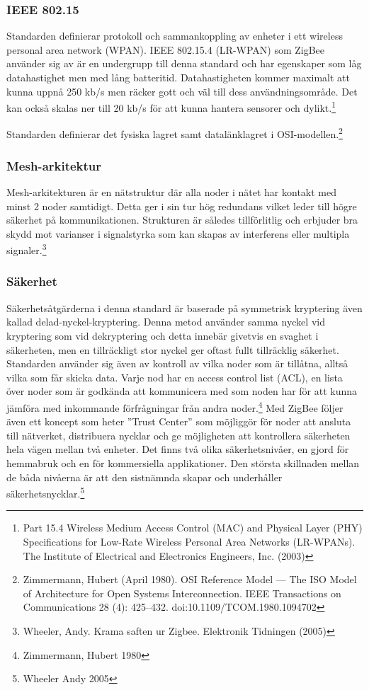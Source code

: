 \documentclass[a4paper,12pt,fleqn]{article}
\begin{document}
\subsubsection{IEEE 802.15}
Standarden definierar protokoll och sammankoppling av enheter i ett wireless personal area network (WPAN). IEEE 802.15.4 (LR-WPAN) som ZigBee använder sig av är en undergrupp till denna standard och har egenskaper som låg datahastighet men med lång batteritid. Datahastigheten kommer maximalt att kunna uppnå 250 kb/s men räcker gott och väl till dess användningsområde. Det kan också skalas ner till 20 kb/s för att kunna hantera sensorer och dylikt.\footnote{\label{IEEE} Part 15.4 Wireless Medium Access Control (MAC) and Physical Layer (PHY) Specifications for Low-Rate Wireless Personal Area Networks (LR-WPANs). The Institute of Electrical and Electronics Engineers, Inc. (2003)}


Standarden definierar det fysiska lagret samt datalänklagret i OSI-modellen.\footnote{Zimmermann, Hubert (April 1980). OSI Reference Model — The ISO Model of Architecture for Open Systems Interconnection. IEEE Transactions on Communications 28 (4): 425–432. doi:10.1109/TCOM.1980.1094702} 


\subsubsection{Mesh-arkitektur}
Mesh-arkitekturen är en nätstruktur där alla noder i nätet har kontakt med minst 2 noder samtidigt. Detta ger i sin tur hög redundans vilket leder till högre säkerhet på kommunikationen. Strukturen är således tillförlitlig och erbjuder bra skydd mot varianser i signalstyrka som kan skapas av interferens eller multipla signaler.\footnote{\label{eltidning} Wheeler, Andy. Krama saften ur Zigbee. Elektronik Tidningen (2005)}

\subsubsection{Säkerhet}
Säkerhetsåtgärderna i denna standard är baserade på symmetrisk kryptering även kallad delad-nyckel-kryptering. Denna metod använder samma nyckel vid kryptering som vid dekryptering och detta innebär givetvis en svaghet i säkerheten, men en tillräckligt stor nyckel ger oftast fullt tillräcklig säkerhet. 
Standarden använder sig även av kontroll av vilka noder som är tillåtna, alltså vilka som får skicka data. Varje nod har en access control list (ACL), en lista över noder som är godkända att kommunicera med som noden har för att kunna jämföra med inkommande förfrågningar från andra noder.\footnote{Zimmermann, Hubert 1980} 
Med ZigBee följer även ett koncept som heter ''Trust Center'' som möjliggör för noder att ansluta till nätverket, distribuera nycklar och ge möjligheten att kontrollera säkerheten hela vägen mellan två enheter. Det finns två olika säkerhetsnivåer, en gjord för hemmabruk och en för kommersiella applikationer. Den största skillnaden mellan de båda nivåerna är att den sistnämnda skapar och underhåller säkerhetsnycklar.\footnote{Wheeler Andy 2005}
\end{document}
